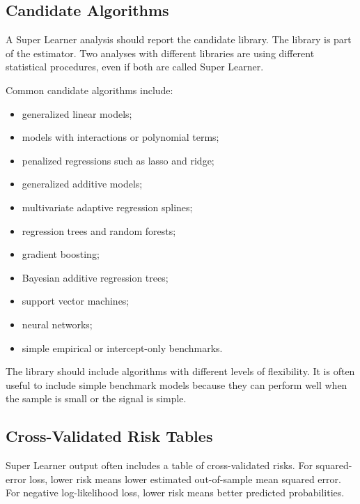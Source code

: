 \label{lec:5-7}

\subsection{Candidate Algorithms}

A Super Learner analysis should report the candidate library. The library is part of
the estimator. Two analyses with different libraries are using different statistical
procedures, even if both are called Super Learner.

Common candidate algorithms include:
\begin{itemize}
\item generalized linear models;
\item models with interactions or polynomial terms;
\item penalized regressions such as lasso and ridge;
\item generalized additive models;
\item multivariate adaptive regression splines;
\item regression trees and random forests;
\item gradient boosting;
\item Bayesian additive regression trees;
\item support vector machines;
\item neural networks;
\item simple empirical or intercept-only benchmarks.
\end{itemize}

The library should include algorithms with different levels of flexibility. It is often
useful to include simple benchmark models because they can perform well when the
sample is small or the signal is simple.

\subsection{Cross-Validated Risk Tables}

Super Learner output often includes a table of cross-validated risks. For squared-error
loss, lower risk means lower estimated out-of-sample mean squared error. For negative
log-likelihood loss, lower risk means better predicted probabilities.

